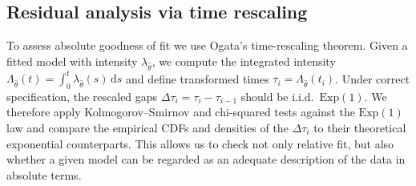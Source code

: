 \subsection{Residual analysis via time rescaling}

To assess absolute goodness of fit we use Ogata's time-rescaling
theorem. Given a fitted model with intensity $\lambda_{\hat\theta}$, we
compute the integrated intensity
$\Lambda_{\hat\theta}(t) = \int_{0}^{t} \lambda_{\hat\theta}(s)\,
\mathrm{d}s$ and define transformed times
$\tau_i = \Lambda_{\hat\theta}(t_i)$. Under correct specification, the
rescaled gaps $\Delta\tau_i = \tau_i - \tau_{i-1}$ should be i.i.d.\
$\mathrm{Exp}(1)$. We therefore apply Kolmogorov--Smirnov and
chi-squared tests against the $\mathrm{Exp}(1)$ law and compare the
empirical CDFs and densities of the $\Delta\tau_i$ to their theoretical
exponential counterparts. This allows us to check not only relative
fit, but also whether a given model can be regarded as an adequate
description of the data in absolute terms.
